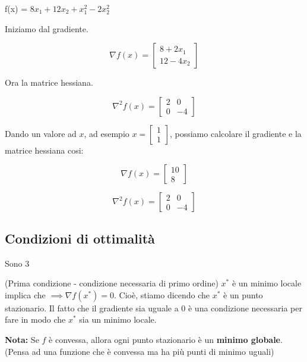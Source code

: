 \begin{esempio}
    f(x) = $8x_1 + 12x_2 + x_1^2 - 2x_2^2$

    Iniziamo dal gradiente.

    $$
        \nabla f(x) = \begin{bmatrix}
            8 +2x_1 \\
            12 - 4x_2
        \end{bmatrix}
    $$

    Ora la matrice hessiana.

    $$
        \nabla^2 f(x) = \begin{bmatrix}
            2 & 0  \\
            0 & -4
        \end{bmatrix}
    $$
    
    Dando un valore ad $x$, ad esempio $x = \begin{bmatrix}
        1 \\
        1
    \end{bmatrix}$, possiamo calcolare il gradiente e la matrice hessiana cosi:

    $$
        \nabla f(x) = \begin{bmatrix}
            10 \\
            8
        \end{bmatrix}
    $$

    $$
        \nabla^2 f(x) = \begin{bmatrix}
            2 & 0  \\
            0 & -4
        \end{bmatrix}
    $$
\end{esempio}

\subsection{Condizioni di ottimalità}
Sono 3

\begin{definition}
    (Prima condizione - condizione necessaria di primo ordine)
    $x^*$ è un minimo locale implica che $\implies \nabla f(x^*) = 0$. Cioè,
    stiamo dicendo che $x^*$ è un punto stazionario. Il fatto che 
    il gradiente sia uguale a 0 è una condizione necessaria per fare in modo che 
    $x^*$ sia un minimo locale.

    \textbf{Nota:} Se $f$ è convessa, allora ogni punto stazionario è 
    un \textbf{minimo globale}.
    (Pensa ad una funzione che è convessa ma ha più punti di minimo uguali)
\end{definition}

